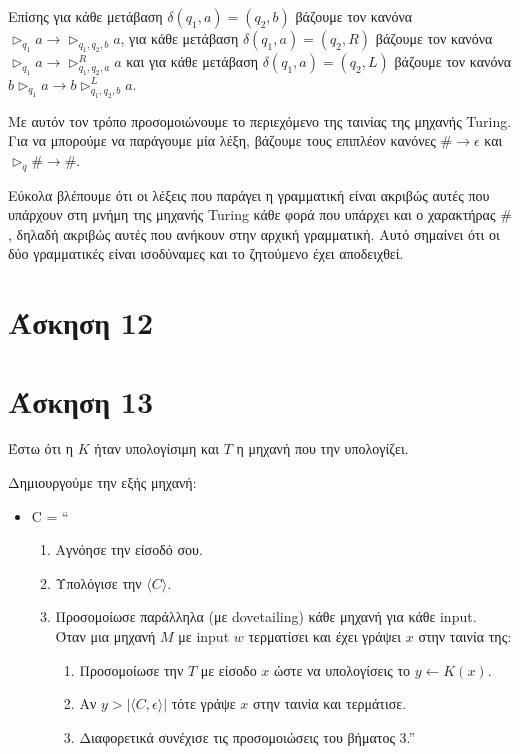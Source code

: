 \documentclass[a4paper, oneside, 11pt]{article}
\theoremstyle{definition}
\begin{document}
Επίσης για κάθε μετάβαση $\delta(q_1,a)=(q_2,b)$ βάζουμε τον κανόνα $\triangleright_{q_1}a\rightarrow \triangleright_{q_1,q_2,b}a$,
για κάθε μετάβαση $\delta(q_1,a)=(q_2,R)$ βάζουμε τον κανόνα $\triangleright_{q_1}a\rightarrow\triangleright_{q_1,q_2,a}^R a$
και για κάθε μετάβαση $\delta(q_1,a)=(q_2,L)$ βάζουμε τον κανόνα $b\triangleright_{q_1}a\rightarrow b\triangleright_{q_1,q_2,b}^L a$.

Με αυτόν τον τρόπο προσομοιώνουμε το περιεχόμενο της ταινίας της μηχανής Turing. Για να μπορούμε να παράγουμε μία λέξη, βάζουμε τους επιπλέον κανόνες
$\#\rightarrow \epsilon$ και $\triangleright_q \#\rightarrow \#$.

Εύκολα βλέπουμε ότι οι λέξεις που παράγει η γραμματική είναι ακριβώς αυτές που υπάρχουν στη μνήμη της μηχανής Turing κάθε φορά που υπάρχει και ο
χαρακτήρας $\#$, δηλαδή ακριβώς αυτές που ανήκουν στην αρχική γραμματική. Αυτό σημαίνει ότι οι δύο γραμματικές είναι ισοδύναμες και το ζητούμενο έχει
αποδειχθεί.

\section*{Άσκηση 12}

\section*{Άσκηση 13}
Έστω ότι η $K$ ήταν υπολογίσιμη και $T$ η μηχανή που την υπολογίζει.

Δημιουργούμε την εξής μηχανή:

\begin{itemize}
\item C = ``
\begin{enumerate}
\item Αγνόησε την είσοδό σου.
\item Υπολόγισε την $\langle C \rangle$.
\item Προσομοίωσε παράλληλα (με dovetailing) κάθε μηχανή για κάθε input.\\
Όταν μια μηχανή $M$ με input $w$ τερματίσει και έχει γράψει $x$ στην ταινία της:
\begin{enumerate}
\item Προσομοίωσε την $T$ με είσοδο $x$ ώστε να υπολογίσεις το $y \leftarrow
K(x)$.
\item Αν $y > |\langle C, \epsilon \rangle|$ τότε γράψε $x$ στην ταινία και τερμάτισε.
\item Διαφορετικά συνέχισε τις προσομοιώσεις του βήματος 3.''
\end{enumerate}
\end{enumerate}
\end{itemize}
\end{document}
